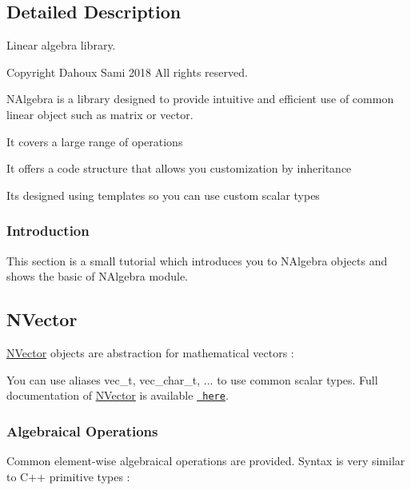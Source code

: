 \subsection{Detailed Description}
Linear algebra library. 

\begin{DoxyCopyright}{Copyright}
Dahoux Sami 2018 All rights reserved.
\end{DoxyCopyright}
N\+Algebra is a library designed to provide intuitive and efficient use of common linear object such as matrix or vector.


\begin{DoxyItemize}
\item It covers a large range of operations
\item It offers a code structure that allows you customization by inheritance
\item It\textquotesingle{}s designed using templates so you can use custom scalar types 
\end{DoxyItemize}\hypertarget{NAlgebraTutoStart}{}\subsubsection{Introduction}\label{NAlgebraTutoStart}
This section is a small tutorial which introduces you to {\ttfamily N\+Algebra} objects and shows the basic of {\ttfamily N\+Algebra} module.\hypertarget{group___n_algebra_NVector}{}\subsection{N\+Vector}\label{group___n_algebra_NVector}
{\ttfamily \mbox{\hyperlink{class_n_vector}{N\+Vector}}} objects are abstraction for mathematical vectors \+:


\begin{DoxyCode}{0}
\end{DoxyCode}


You can use aliases {\ttfamily vec\+\_\+t}, {\ttfamily vec\+\_\+char\+\_\+t}, ... to use common scalar types. Full documentation of {\ttfamily \mbox{\hyperlink{class_n_vector}{N\+Vector}}} is available \href{https://samibendou.github.io/MathToolKitCPP/class_n_vector.html}{\texttt{ here}}.\hypertarget{group___n_algebra_AlgclOpVec}{}\subsubsection{Algebraical Operations}\label{group___n_algebra_AlgclOpVec}
Common element-\/wise algebraical operations are provided. Syntax is very similar to C++ primitive types \+:


